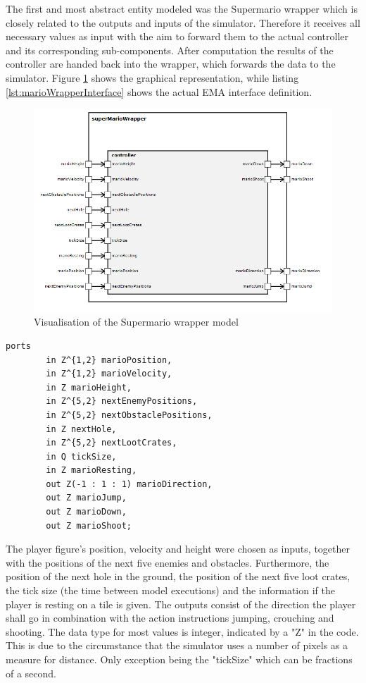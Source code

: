 The first and most abstract entity modeled was the Supermario wrapper which is closely related to the outputs and inputs of the simulator. Therefore it receives all necessary values as input with the aim to forward them to the actual controller and its corresponding sub-components. After computation the results of the controller are handed back into the wrapper, which forwards the data to the simulator. Figure \ref{fig:marioWrapper} shows the graphical representation, while listing \ref{lst:marioWrapperInterface} shows the actual EMA interface definition.
\begin{figure}
	\centering
	\includegraphics[scale=0.5]{pictures/haller_supermariowrapper.PNG}
	\caption{Visualisation of the Supermario wrapper model}
	\label{fig:marioWrapper}
\end{figure}

\begin{lstlisting}[label=lst:marioWrapperInterface, caption=Interface of the Supermario Wrapper, morekeywords={ports, port, connect, in, out, instance, ->},
frame=single,float,floatplacement=H]
    ports   
        in Z^{1,2} marioPosition,
        in Z^{1,2} marioVelocity,
        in Z marioHeight,
        in Z^{5,2} nextEnemyPositions,
        in Z^{5,2} nextObstaclePositions,
        in Z nextHole,
        in Z^{5,2} nextLootCrates,
        in Q tickSize,
        in Z marioResting,
        out Z(-1 : 1 : 1) marioDirection,
        out Z marioJump,
        out Z marioDown,
        out Z marioShoot;
\end{lstlisting}

The player figure's position, velocity and height were chosen as inputs, together with the positions of the next five enemies and obstacles. Furthermore, the position of the next hole in the ground, the position of the next five loot crates, the tick size (the time between model executions) and the information if the player is resting on a tile is given.
The outputs consist of the direction the player shall go in combination with the action instructions jumping, crouching and shooting.
The data type for most values is integer, indicated by a "Z" in the code. This is due to the circumstance that the simulator uses a number of pixels as a measure for distance. Only exception being the "tickSize" which can be fractions of a second.

